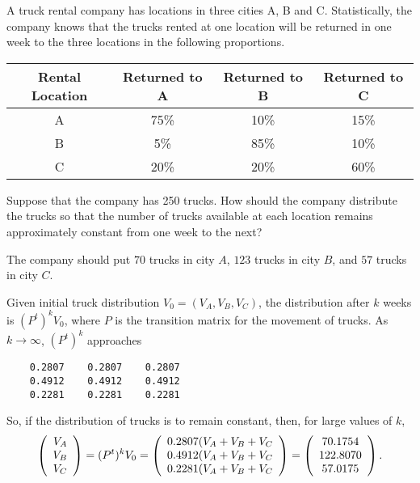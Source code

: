 \documentclass{ximera}
\begin{document}
\begin{computerExercise} \label{c4.10.6}
A truck rental company has locations in three cities A, B and C.
Statistically, the company knows that the trucks rented at one location will
be returned in one week to the three locations in the following proportions.
\begin{center}
\begin{tabular}{|c||c|c|c|}
\hline
Rental Location &  Returned to A & Returned to B & Returned to C\\
\hline
A  & 75\% & 10\%  & 15\% \\
\hline
B & 5\% & 85\% & 10\% \\
\hline
C & 20\% & 20\% & 60\%\\
\hline
\end{tabular}
\end{center}
Suppose that the company has 250 trucks.  How should the company distribute
the trucks so that the number of trucks available at each location remains
approximately constant from one week to the next?

\begin{solution}

\ans The company should put $70$ trucks in city $A$, $123$ trucks in city
$B$, and $57$ trucks in city $C$.

\soln Given initial truck distribution $V_0 = (V_A,V_B,V_C)$, the
distribution after $k$ weeks is $(P^t)^kV_0$, where $P$ is the transition
matrix for the movement of trucks.  As $k \rightarrow \infty$, $(P^t)^k$
approaches
\begin{verbatim}
    0.2807    0.2807    0.2807
    0.4912    0.4912    0.4912
    0.2281    0.2281    0.2281
\end{verbatim}
So, if the distribution of trucks is to remain constant, then, for large
values of $k$,
\[
\left(\begin{array}{r} V_A \\ V_B \\ V_C\end{array}\right) = (P^t)^kV_0 = \left(\begin{array}{c} 0.2807(V_A +
V_B + V_C \\ 0.4912(V_A + V_B + V_C \\ 0.2281(V_A + V_B + V_C\end{array}\right) =
\left(\begin{array}{c} 70.1754 \\ 122.8070 \\ 57.0175\end{array}\right).
\]

\end{solution}
\end{computerExercise}
\end{document}
